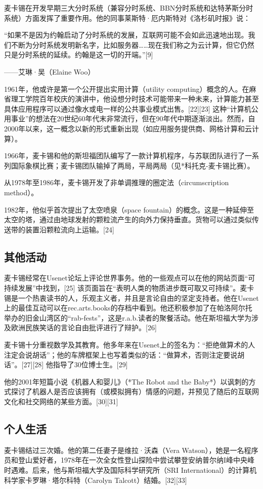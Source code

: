 麦卡锡在开发早期三大分时系统（兼容分时系统、BBN分时系统和达特茅斯分时系统）方面发挥了重要作用。他的同事莱斯特·厄内斯特对《洛杉矶时报》说：

“如果不是因为约翰启动了分时系统的发展，互联网可能不会如此迅速地出现。我们不断为分时系统发明新名字，比如服务器……现在我们称之为云计算，但它仍然只是分时系统的延续。约翰是这一切的开端。”[9]  

——艾琳·吴（Elaine Woo）

1961年，他或许是第一个公开提出实用计算（utility computing）概念的人。在麻省理工学院百年校庆的演讲中，他设想分时技术可能带来一种未来，计算能力甚至具体应用程序可以通过像水或电一样的公共事业模式出售。[22][23] 这种“计算机公用事业”的想法在20世纪60年代末非常流行，但在90年代中期逐渐淡出。然而，自2000年以来，这一概念以新的形式重新出现（如应用服务提供商、网格计算和云计算）。

1966年，麦卡锡和他的斯坦福团队编写了一款计算机程序，与苏联团队进行了一系列国际象棋比赛；麦卡锡团队输掉了两局，平局两局（见*科托克-麦卡锡比赛）。

从1978年至1986年，麦卡锡开发了非单调推理的圈定法（circumscription method）。

1982年，他似乎首次提出了太空喷泉（space fountain）的概念。这是一种延伸至太空的塔，通过由地球发射的颗粒流产生的向外力保持垂直。货物可以通过类似传送带的装置沿颗粒流向上运输。[24]
\subsection{其他活动}
麦卡锡经常在Usenet论坛上评论世界事务。他的一些观点可以在他的网站页面“可持续发展”中找到，[25] 该页面旨在“表明人类的物质进步既可取又可持续”。麦卡锡是一个热衷读书的人，乐观主义者，并且是言论自由的坚定支持者。他在Usenet上的最佳互动可以在rec.arts.books的存档中看到。他还积极参加了在帕洛阿尔托举办的旧金山湾区的“rab-fests”，这是r.a.b.读者的聚餐活动。他在斯坦福大学为涉及欧洲民族笑话的言论自由批评进行了辩护。[26]

麦卡锡十分重视数学及其教育。他多年来在Usenet上的签名为：“拒绝做算术的人注定会说胡话”；他的车牌框架上也写着类似的话：“做算术，否则注定要说胡话”。[27][28] 他指导了30位博士生。[29]

他的2001年短篇小说《机器人和婴儿》（*The Robot and the Baby*）以讽刺的方式探讨了机器人是否应该拥有（或模拟拥有）情感的问题，并预见了随后的互联网文化和社交网络的某些方面。[30][31]
\subsection{个人生活}
麦卡锡结过三次婚。他的第二任妻子是维拉·沃森（Vera Watson），她是一名程序员和登山爱好者，1978年在一次全女性登山探险中尝试攀登安纳普尔纳I峰中央峰时遇难。后来，他与斯坦福大学及国际科学研究所（SRI International）的计算机科学家卡罗琳·塔尔科特（Carolyn Talcott）结婚。[32][33]

